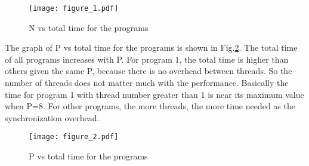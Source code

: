 \documentclass[12pt]{article}
\begin{document}
\begin{figure}[h!]
	\begin{center}
		\texttt{[image: figure\_1.pdf]}
		\caption{\label{fig:1}N vs total time for the programs}
	\end{center}
\end{figure}
The graph of P vs total time for the programs is shown in Fig.\ref{fig:2}.
The total time of all programs increases with P. For program 1, the total time
is higher than others given the same P, because there is no overhead between 
threads. So the number of threads does not matter much with the performance.
Basically the time for program 1 with thread number greater than 1 is near its
maximum value when P=8. For other programs, the more threads, the more time 
needed as the synchronization overhead.

\begin{figure}[h!]
	\begin{center}
		\texttt{[image: figure\_2.pdf]}
		\caption{\label{fig:2}P vs total time for the programs}
	\end{center}
\end{figure}
\end{document}
